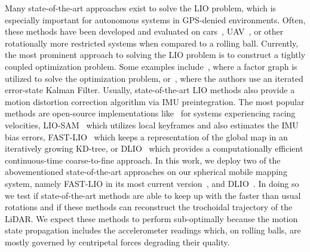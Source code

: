 Many state-of-the-art approaches exist to solve the LIO problem, which is especially important for autonomous systems in GPS-denied environments.
Often, these methods have been developed and evaluated on cars~\cite{8967880}, UAV~\cite{s21123955}, or other rotationally more restricted systems when compared to a rolling ball. 
Currently, the most prominent approach to solving the LIO problem is to construct a tightly coupled optimization problem.
Some examples include~\cite{9760190}, where a factor graph is utilized to solve the optimization problem, or~\cite{9197567}, where the authors use an iterated error-state Kalman Filter.
Usually, state-of-the-art LIO methods also provide a motion distortion correction algorithm via IMU preintegration.
The most popular methods are open-source implementations like~\cite{huguet2022limo} for systems experiencing racing velocities, LIO-SAM~\cite{9341176} which utilizes local keyframes and also estimates the IMU bias errors, FAST-LIO~\cite{xu2022fast} which keeps a representation of the global map in an iteratively growing KD-tree, or DLIO~\cite{10160508} which provides a computationally efficient continuous-time coarse-to-fine approach.
In this work, we deploy two of the abovementioned state-of-the-art approaches on our spherical mobile mapping system, namely FAST-LIO in its most current version~\cite{xu2022fast}, and DLIO~\cite{10160508}.
In doing so we test if state-of-the-art methods are able to keep up with the faster than usual rotations and if these methods can reconstruct the trochoidal trajectory of the LiDAR.
We expect these methods to perform sub-optimally because the motion state propagation includes the accelerometer readings which, on rolling balls, are mostly governed by centripetal forces degrading their quality.     